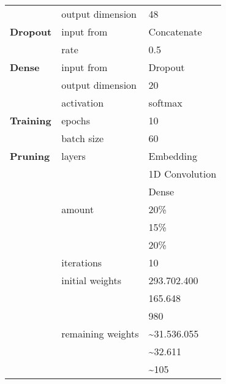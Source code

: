 \begin{appendices}
\begin{tabularx}{\textwidth}[!h]{X X X}
	& output dimension & 48\\
	[8pt]
	\textbf{Dropout} & input from & Concatenate\\
	& rate & 0.5\\
	[8pt]
	\textbf{Dense} & input from & Dropout\\
	& output dimension & 20\\
	& activation & softmax\\
	\hline
	\textbf{Training} & epochs & 10\\
	& batch size & 60\\
	\hline
	\textbf{Pruning} & layers & Embedding\\
	& & 1D Convolution\\
	& & Dense\\
	& amount & 20\%\\
	& & 15\%\\
	& & 20\%\\
	& iterations & 10\\
	& initial weights & 293.702.400\\
	& & 165.648\\
	& & 980\\
	& remaining weights & \textasciitilde31.536.055\\
	& & \textasciitilde32.611\\
	& & \textasciitilde105\\
	\hline
\end{tabularx}





\end{appendices}